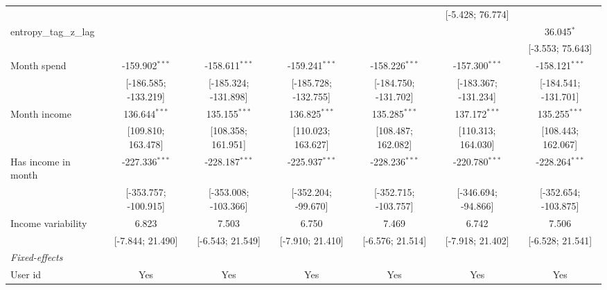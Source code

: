 \begin{table}[htbp]
\begin{threeparttable}[b]
\begin{tabular}{lcccccc}
                                         &                      &                      &                      &                      & [-5.428; 76.774]     &   \\   
         entropy\_tag\_z\_lag            &                      &                      &                      &                      &                      & 36.045$^{*}$\\   
                                         &                      &                      &                      &                      &                      & [-3.553; 75.643]\\   
         Month spend                     & -159.902$^{***}$     & -158.611$^{***}$     & -159.241$^{***}$     & -158.226$^{***}$     & -157.300$^{***}$     & -158.121$^{***}$\\   
                                         & [-186.585; -133.219] & [-185.324; -131.898] & [-185.728; -132.755] & [-184.750; -131.702] & [-183.367; -131.234] & [-184.541; -131.701]\\   
         Month income                    & 136.644$^{***}$      & 135.155$^{***}$      & 136.825$^{***}$      & 135.285$^{***}$      & 137.172$^{***}$      & 135.255$^{***}$\\   
                                         & [109.810; 163.478]   & [108.358; 161.951]   & [110.023; 163.627]   & [108.487; 162.082]   & [110.313; 164.030]   & [108.443; 162.067]\\   
         Has income in month             & -227.336$^{***}$     & -228.187$^{***}$     & -225.937$^{***}$     & -228.236$^{***}$     & -220.780$^{***}$     & -228.264$^{***}$\\   
                                         & [-353.757; -100.915] & [-353.008; -103.366] & [-352.204; -99.670]  & [-352.715; -103.757] & [-346.694; -94.866]  & [-352.654; -103.875]\\   
         Income variability              & 6.823                & 7.503                & 6.750                & 7.469                & 6.742                & 7.506\\   
                                         & [-7.844; 21.490]     & [-6.543; 21.549]     & [-7.910; 21.410]     & [-6.576; 21.514]     & [-7.918; 21.402]     & [-6.528; 21.541]\\   
         \midrule
         \emph{Fixed-effects}\\
         User id                         & Yes                  & Yes                  & Yes                  & Yes                  & Yes                  & Yes\\  

\end{tabular}
\end{threeparttable}
\end{table}
